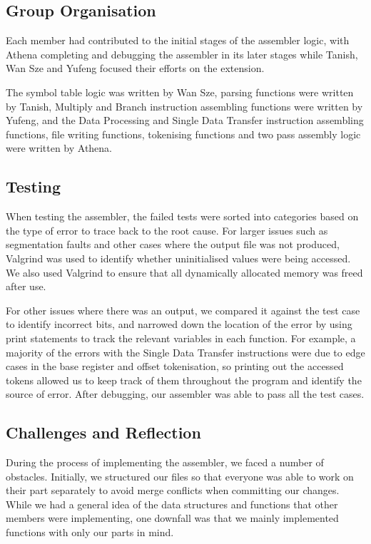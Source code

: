 \documentclass[a4paper,11pt]{article}
\begin{document}
\subsection{Group Organisation}
Each member had contributed to the initial stages of the assembler logic, with Athena completing and debugging the assembler in its later stages while Tanish, Wan Sze and Yufeng focused their efforts on the extension.\newline

The symbol table logic was written by Wan Sze, parsing functions were written by Tanish, Multiply and Branch instruction assembling functions were written by Yufeng, and the Data Processing and Single Data Transfer instruction assembling functions, file writing functions, tokenising functions and two pass assembly logic were written by Athena.

\subsection{Testing}
When testing the assembler, the failed tests were sorted into categories based on the type of error to trace back to the root cause. For larger issues such as segmentation faults and other cases where the output file was not produced, Valgrind was used to identify whether uninitialised values were being accessed. We also used Valgrind to ensure that all dynamically allocated memory was freed after use. \newline

For other issues where there was an output, we compared it against the test case to identify incorrect bits, and narrowed down the location of the error by using print statements to track the relevant variables in each function. For example, a majority of the errors with the Single Data Transfer instructions were due to edge cases in the base register and offset tokenisation, so printing out the accessed tokens allowed us to keep track of them throughout the program and identify the source of error. After debugging, our assembler was able to pass all the test cases.

\subsection{Challenges and Reflection}
During the process of implementing the assembler, we faced a number of obstacles. Initially, we structured our files so that everyone was able to work on their part separately to avoid merge conflicts when committing our changes. While we had a general idea of the data structures and functions that other members were implementing, one downfall was that we mainly implemented functions with only our parts in mind. \newline
\end{document}
